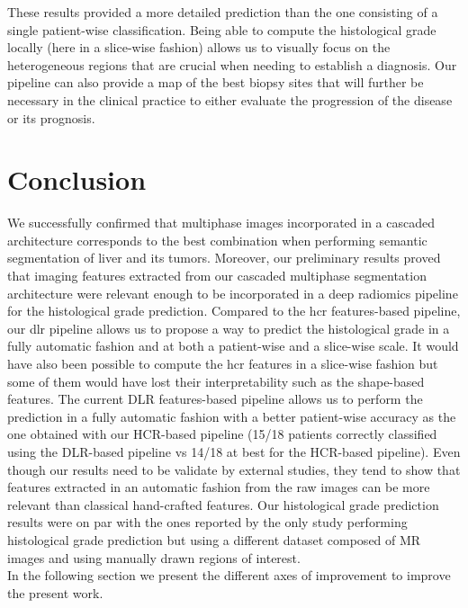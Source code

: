 \documentclass[]{article}
\begin{document}
These results provided a more detailed prediction than the one
consisting of a single patient-wise classification. Being able to
compute the histological grade locally (here in a slice-wise fashion)
allows us to visually focus on the heterogeneous regions that are
crucial when needing to establish a diagnosis. Our pipeline can also
provide a map of the best biopsy sites that will further be necessary in
the clinical practice to either evaluate the progression of the disease
or its prognosis.\\


\section{Conclusion}


We successfully confirmed that multiphase images incorporated in a cascaded architecture corresponds to the best combination when performing semantic segmentation of liver and its tumors. Moreover, our preliminary results proved that imaging features extracted from our cascaded multiphase segmentation architecture were relevant enough to be incorporated in a deep radiomics pipeline for the histological grade prediction. 
Compared to the \ac{hcr} features-based pipeline, our \ac{dlr} pipeline allows us to propose a way to predict the histological grade in a fully automatic fashion and at both a patient-wise and a slice-wise scale. 
It would have also been possible to compute the \ac{hcr} features in a slice-wise fashion but some of them would have lost their interpretability such as the shape-based features. The current DLR features-based pipeline allows us to perform the prediction in a fully automatic fashion with a better patient-wise accuracy as the one obtained with our HCR-based pipeline (15/18 patients correctly classified using the DLR-based pipeline vs 14/18 at best for the HCR-based pipeline).
Even though our results need to be validate by external studies, they tend to show that features extracted in an automatic fashion from the raw images can be more relevant than classical hand-crafted features.
Our histological grade prediction results were on par with the ones reported by the only study performing histological grade prediction but using a different dataset composed of MR images and using manually drawn regions of interest.\\
In the following section we present the different axes of improvement to improve the present work.


\newpage
%
\printbibliography[heading=bibintoc]
\end{document}
